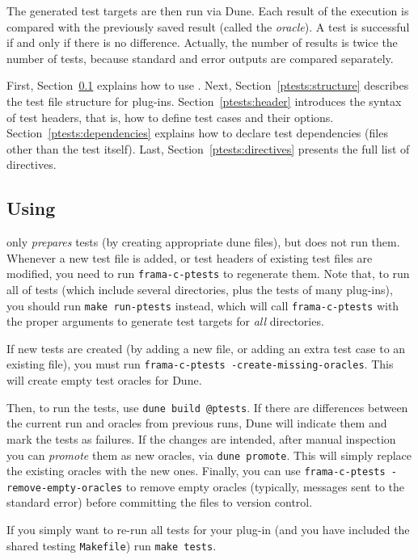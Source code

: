 The generated test targets are then run via Dune.
Each result of the execution is compared with the previously saved result
(called the \emph{oracle}). A test is successful if and only
if there is no difference.  Actually, the number of results is twice the
number of tests, because standard and error outputs are compared separately.

First, Section~\ref{ptests:use} explains how to use \ptests.
Next, Section~\ref{ptests:structure} describes the test file structure for
\framac plug-ins.
Section~\ref{ptests:header} introduces the syntax of test headers, that is,
how to define test cases and their options. Section~\ref{ptests:dependencies}
explains how to declare test dependencies (files other than the test itself).
Last, Section~\ref{ptests:directives} presents the full list of \ptests
directives.

\subsection{Using \ptests}\label{ptests:use}

\ptests only {\em prepares} tests (by creating appropriate dune files), but
does not run them. Whenever a new test file is added, or test headers of
existing test files are modified, you need to run \verb|frama-c-ptests| to
regenerate them.
Note that, to run all of \framac tests (which include several directories, plus
the tests of many plug-ins), you should run \verb|make run-ptests| instead,
which will call \verb|frama-c-ptests| with the proper arguments to generate
test targets for {\em all} directories.

If new tests are created (by adding a new file, or adding an extra test case to
an existing file), you must run \verb|frama-c-ptests -create-missing-oracles|.
This will create empty test oracles for Dune.

Then, to run the tests, use \verb|dune build @ptests|.
If there are differences between the current run and oracles from previous runs,
Dune will indicate them and mark the tests as failures. If the changes are
intended, after manual inspection you can {\em promote} them as new oracles,
via \verb|dune promote|. This will simply replace the existing oracles with the
new ones. Finally, you can use \verb|frama-c-ptests -remove-empty-oracles|
to remove empty oracles (typically, messages sent to the standard error)
before committing the files to version control.

If you simply want to re-run all tests for your plug-in (and you have included
the shared testing \verb|Makefile|) run \verb|make tests|.

